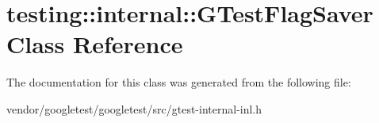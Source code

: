 \hypertarget{classtesting_1_1internal_1_1_g_test_flag_saver}{}\section{testing\+:\+:internal\+:\+:G\+Test\+Flag\+Saver Class Reference}
\label{classtesting_1_1internal_1_1_g_test_flag_saver}


The documentation for this class was generated from the following file\+:\begin{DoxyCompactItemize}
\item 
vendor/googletest/googletest/src/gtest-\/internal-\/inl.\+h\end{DoxyCompactItemize}
